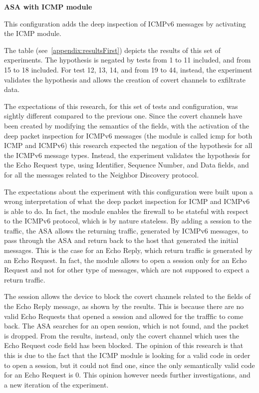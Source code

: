 \documentclass[12pt]{article}
\begin{document}
\textbf{ASA with ICMP module}
\label{resultsFirstASADefaultICMP}

This configuration adds the deep inspection of ICMPv6 messages by activating the ICMP module.

The table (see~\cref{appendix:resultsFirst}) depicts the results of this set of experiments. The hypothesis is negated by tests from 1 to 11 included, and from 15 to 18 included. For test 12, 13, 14, and from 19 to 44, instead, the experiment validates the hypothesis and allows the creation of covert channels to exfiltrate data.

The expectations of this research, for this set of tests and configuration, was sightly different compared to the previous one. Since the covert channels have been created by modifying the semantics of the fields, with the activation of the deep packet inspection for ICMPv6 messages (the module is called icmp for both ICMP and ICMPv6) this research expected the negation of the hypothesis for all the ICMPv6 message types. Instead, the experiment validates the hypothesis for the Echo Request type, using Identifier, Sequence Number, and Data fields, and for all the messages related to the Neighbor Discovery protocol.

The expectations about the experiment with this configuration were built upon a wrong interpretation of what the deep packet inspection for ICMP and ICMPv6 is able to do. In fact, the module enables the firewall to be stateful with respect to the ICMPv6 protocol, which is by nature stateless. By adding a session to the traffic, the ASA allows the returning traffic, generated by ICMPv6 messages, to pass through the ASA and return back to the host that generated the initial messages. This is the case for an Echo Reply, which return traffic is generated by an Echo Request. In fact, the module allows to open a session only for an Echo Request and not for other type of messages, which are not supposed to expect a return traffic.

The session allows the device to block the covert channels related to the fields of the Echo Reply message, as shown by the results. This is because there are no valid Echo Requests that opened a session and allowed for the trafffic to come back. The ASA searches for an open session, which is not found, and the packet is dropped. From the results, instead, only the covert channel which uses the Echo Request code field has been blocked. The opinion of this research is that this is due to the fact that the ICMP module is looking for a valid code in order to open a session, but it could not find one, since the only semantically valid code for an Echo Request is 0. This opinion however needs further investigations, and a new iteration of the experiment. 
\end{document}
